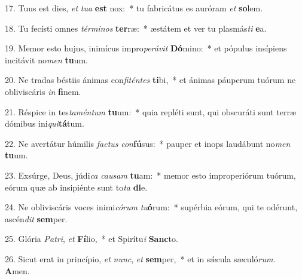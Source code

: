 17. Tuus est dies, \textit{et} \textit{tu}\textit{a} \textbf{est} nox:~*  tu fabricátus es auróram \textit{et} \textbf{so}lem.\

18. Tu fecísti omnes \textit{tér}\textit{mi}\textit{nos} \textbf{ter}ræ:~*  æstátem et ver tu plasmás\textit{ti} \textbf{e}a.\

19. Memor esto hujus, inimícus impro\textit{pe}\textit{rá}\textit{vit} \textbf{Dó}mino:~*  et pópulus insípiens incitávit no\textit{men} \textbf{tu}um.\

20. Ne tradas béstiis ánimas con\textit{fi}\textit{tén}\textit{tes} \textbf{ti}bi,~*  et ánimas páuperum tuórum ne obliviscáris \textit{in} \textbf{fi}nem.\

21. Réspice in tes\textit{ta}\textit{mén}\textit{tum} \textbf{tu}um:~*  quia repléti sunt, qui obscuráti sunt terræ dómibus ini\textit{qui}\textbf{tá}tum.\

22. Ne avertátur húmilis \textit{fac}\textit{tus} \textit{con}\textbf{fú}sus:~*  pauper et inops laudábunt no\textit{men} \textbf{tu}um.\

23. Exsúrge, Deus, júdi\textit{ca} \textit{cau}\textit{sam} \textbf{tu}am:~*  memor esto improperiórum tuórum, eórum quæ ab insipiénte sunt to\textit{ta} \textbf{di}e.\

24. Ne obliviscáris voces inimi\textit{có}\textit{rum} \textit{tu}\textbf{ó}rum:~*  supérbia eórum, qui te odérunt, ascén\textit{dit} \textbf{sem}per.\

25. Glória \textit{Pa}\textit{tri}, \textit{et} \textbf{Fí}lio,~*  et Spirítu\textit{i} \textbf{Sanc}to.\

26. Sicut erat in princípio, \textit{et} \textit{nunc}, \textit{et} \textbf{sem}per,~*  et in sǽcula sæculó\textit{rum}. \textbf{A}men.\

